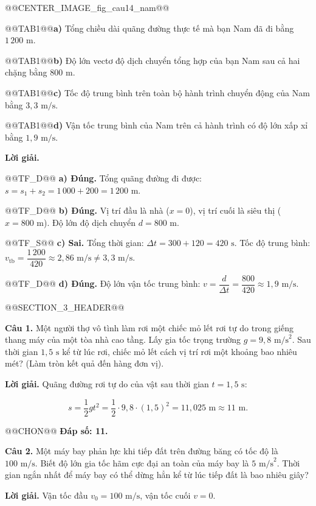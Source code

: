 \documentclass{article}
\begin{document}
@@CENTER_IMAGE_fig_cau14_nam@@

@@TAB1@@\textbf{a)} Tổng chiều dài quãng đường thực tế mà bạn Nam đã đi bằng $1\,200\text{ m}$.

@@TAB1@@\textbf{b)} Độ lớn vectơ độ dịch chuyển tổng hợp của bạn Nam sau cả hai chặng bằng $800\text{ m}$.

@@TAB1@@\textbf{c)} Tốc độ trung bình trên toàn bộ hành trình chuyển động của Nam bằng $3{,}3\text{ m/s}$.

@@TAB1@@\textbf{d)} Vận tốc trung bình của Nam trên cả hành trình có độ lớn xấp xỉ bằng $1{,}9\text{ m/s}$.

\textbf{Lời giải.}

@@TF_D@@ \textbf{a) Đúng.} Tổng quãng đường đi được: $s = s_1 + s_2 = 1\,000 + 200 = 1\,200\text{ m}$.

@@TF_D@@ \textbf{b) Đúng.} Vị trí đầu là nhà ($x = 0$), vị trí cuối là siêu thị ($x = 800\text{ m}$). Độ lớn độ dịch chuyển $d = 800\text{ m}$.

@@TF_S@@ \textbf{c) Sai.} Tổng thời gian: $\Delta t = 300 + 120 = 420\text{ s}$. Tốc độ trung bình: $v_{\text{tb}} = \dfrac{1\,200}{420} \approx 2{,}86\text{ m/s} \ne 3{,}3\text{ m/s}$.

@@TF_D@@ \textbf{d) Đúng.} Độ lớn vận tốc trung bình: $v = \dfrac{d}{\Delta t} = \dfrac{800}{420} \approx 1{,}9\text{ m/s}$.

@@SECTION_3_HEADER@@

\textbf{Câu 1.} Một người thợ vô tình làm rơi một chiếc mỏ lết rơi tự do trong giếng thang máy của một tòa nhà cao tầng. Lấy gia tốc trọng trường $g = 9{,}8\text{ m/s}^2$. Sau thời gian $1{,}5\text{ s}$ kể từ lúc rơi, chiếc mỏ lết cách vị trí rơi một khoảng bao nhiêu mét? (Làm tròn kết quả đến hàng đơn vị).

\textbf{Lời giải.} Quãng đường rơi tự do của vật sau thời gian $t = 1{,}5\text{ s}$:

\[s = \frac{1}{2}gt^2 = \frac{1}{2} \cdot 9{,}8 \cdot (1{,}5)^2 = 11{,}025\text{ m} \approx 11\text{ m}.\]

@@CHON@@ \textbf{Đáp số: 11.}

\textbf{Câu 2.} Một máy bay phản lực khi tiếp đất trên đường băng có tốc độ là $100\text{ m/s}$. Biết độ lớn gia tốc hãm cực đại an toàn của máy bay là $5\text{ m/s}^2$. Thời gian ngắn nhất để máy bay có thể dừng hẳn kể từ lúc tiếp đất là bao nhiêu giây?

\textbf{Lời giải.} Vận tốc đầu $v_0 = 100\text{ m/s}$, vận tốc cuối $v = 0$.
\end{document}
